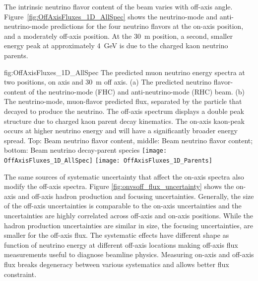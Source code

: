 The intrinsic neutrino flavor content of the beam varies with off-axis angle. Figure~\ref{fig:OffAxisFluxes_1D_AllSpec} shows the neutrino-mode and anti-neutrino-mode predictions for the four neutrino flavors at the on-axis position, and a moderately off-axis position. At the \SI{30}{m} position, a second, smaller energy peak at approximately \SI{4}{\GeV} is due to the charged kaon neutrino parents. 

\begin{dunefigure}{fig:OffAxisFluxes_1D_AllSpec}
{The predicted muon neutrino energy spectra at two  positions, on axis and \SI{30}{m} off axis. (a) The predicted neutrino flavor-content of the neutrino-mode (FHC) and anti-neutrino-mode (RHC) beam. (b) The neutrino-mode, muon-flavor predicted flux, separated by the particle that decayed to produce the neutrino. The off-axis spectrum displays a double peak structure due to charged kaon parent decay kinematics. The on-axis kaon-peak occurs at higher neutrino energy and will have a significantly broader energy spread. Top: Beam neutrino flavor content, middle: Beam neutrino flavor content; bottom: Beam neutrino decay-parent species}
    \texttt{[image: OffAxisFluxes\_1D\_AllSpec]}
  \texttt{[image: OffAxisFluxes\_1D\_Parents]}    
    \end{dunefigure}


The same sources of systematic uncertainty that affect the on-axis spectra also modify the off-axis spectra. 
Figure \ref{fig:onvsoff_flux_uncertainty} shows the on-axis and off-axis hadron production and focusing uncertainties. 
Generally, the size of the off-axis uncertainties is comparable to the on-axis uncertainties and the uncertainties are highly correlated across off-axis and on-axis positions. While the hadron production uncertainties are similar in size, the focusing uncertainties, are smaller for the off-axis flux. The systematic effects have different shape as function of neutrino energy at different off-axis locations making off-axis flux measurements useful to diagnose beamline physics. Measuring on-axis and off-axis flux breaks degeneracy between various systematics and allows better flux constraint.


